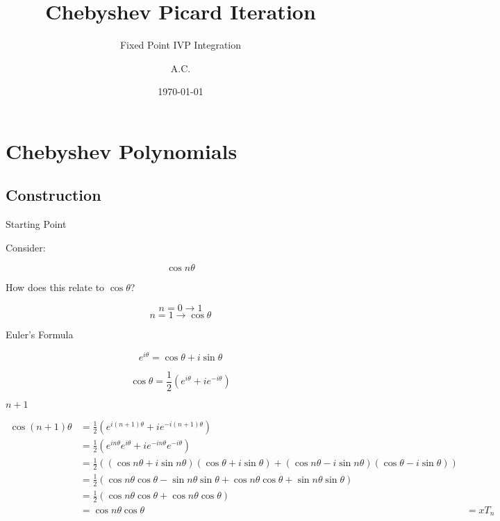 \documentclass[pdf]{beamer}
\title{Chebyshev Picard Iteration}
\subtitle{Fixed Point IVP Integration}
\author{A.C.}
\date{\today}
\begin{document}
\begin{frame}
  \titlepage
\end{frame}

\section{Chebyshev Polynomials}

\subsection{Construction}

\begin{frame}{Starting Point}

  Consider:
  
  \[ \cos n \theta \]

  How does this relate to $\cos \theta$?

  \pause 
  \[ n = 0 \rightarrow 1 \]
  \[ n = 1 \rightarrow \cos \theta \]
  
\end{frame}

\begin{frame}{Euler's Formula}

  \[ e^{i\theta} = \cos \theta + i \sin \theta \]

  \pause
  
  \[ \cos \theta = \frac{1}{2} \left( e^{i\theta} + ie^{-i\theta} \right) \]

  
\end{frame}

\begin{frame}{$n+1$}

\begin{align*}
  \cos (n+1) \theta &= \frac{1}{2} \left( e^{i(n+1)\theta} + ie^{-i(n+1)\theta} \right)\\
                    &= \frac{1}{2} \left( e^{in\theta}e^{i\theta} + ie^{-in\theta}e^{-i\theta} \right)\\
                    &= \frac{1}{2} \left( (\cos n \theta + i \sin n \theta)(\cos \theta + i \sin \theta) + (\cos n \theta - i \sin n \theta)(\cos \theta - i \sin \theta) \right)\\
                    &= \frac{1}{2} \left( \cos n \theta \cos \theta - \sin n \theta \sin \theta + \cos n \theta \cos \theta + \sin n \theta \sin \theta \right)\\
                    &= \frac{1}{2} \left( \cos n \theta \cos \theta + \cos n \theta \cos \theta \right)\\
                    &= \cos n \theta \cos \theta
                    &= xT_n
\end{align*}
\end{frame}
\end{document}

